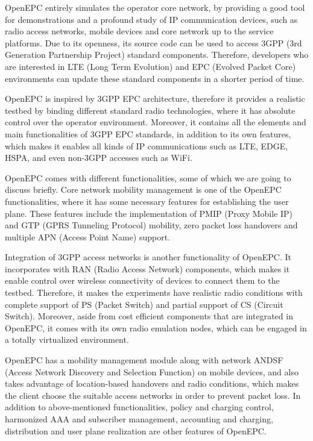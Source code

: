 OpenEPC entirely simulates the operator core network, by providing a good tool for demonstrations and a profound study of IP communication devices, such as radio access networks, mobile devices and core network up to the service platforms. Due to its openness, its source code can be used to access 3GPP (3rd Generation Partnership Project) standard components. Therefore, developers who are interested in LTE (Long Term Evolution) and EPC (Evolved Packet Core) environments can update these standard components in a shorter period of time. 

OpenEPC is inspired by 3GPP EPC architecture, therefore it provides a realistic testbed by binding different standard radio technologies, where it has absolute control over the operator environment. Moreover, it contains all the elements and main functionalities of 3GPP EPC standards, in addition to its own features, which makes it enables all kinds of IP communications such as LTE, EDGE, HSPA, and even non-3GPP accesses such as WiFi. 

OpenEPC comes with different functionalities, some of which we are going to discuss briefly. Core network mobility management is one of the OpenEPC functionalities, where it has some necessary features for establishing the user plane. These features include the implementation of PMIP (Proxy Mobile IP) and GTP (GPRS Tunneling Protocol) mobility, zero packet loss handovers and multiple APN (Access Point Name) support.  

Integration of 3GPP access networks is another functionality of OpenEPC. It incorporates with RAN (Radio Access Network) components, which makes it enable control over wireless connectivity of devices to connect them to the testbed. Therefore, it makes the experiments have realistic radio conditions with complete support of PS (Packet Switch) and partial support of CS (Circuit Switch). Moreover, aside from cost efficient components that are integrated in OpenEPC, it comes with its own radio emulation nodes, which can be engaged in a totally virtualized environment. 

OpenEPC has a mobility management module along with network ANDSF (Access Network Discovery and Selection Function) on mobile devices, and also takes advantage of location-based handovers and radio conditions, which makes the client choose the suitable access networks in order to prevent packet loss. In addition to above-mentioned functionalities, policy and charging control, harmonized AAA and subscriber management, accounting and charging, distribution and user plane realization are other features of OpenEPC. 

